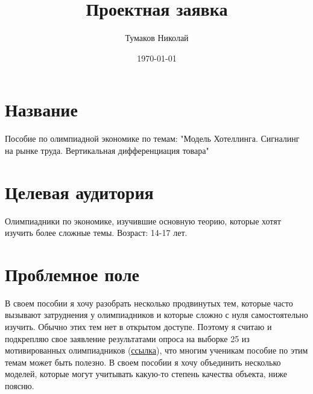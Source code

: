 


\title{Проектная заявка}
\author{Тумаков Николай}
\date{\today}




\maketitle

\section*{}

\section{Название}
Пособие по олимпиадной экономике по темам: "Модель Хотеллинга. Сигналинг на рынке труда. Вертикальная дифференциация товара"

\section{Целевая аудитория}
Олимпиадники по экономике, изучившие основную теорию, которые хотят изучить более сложные темы. Возраст: 14-17 лет.

\section{Проблемное поле}
В своем пособии я хочу разобрать несколько продвинутых тем, которые часто вызывают затруднения у олимпиадников и которые сложно с нуля самостоятельно изучить. Обычно этих тем нет в открытом доступе. Поэтому я считаю и подкрепляю свое заявление результатами опроса на выборке 25 из мотивированных олимпиадников (\href{https://docs.google.com/document/d/1WK_wnkck95BfUkFfhx7ZT7HdcT96Bs2Y3aL5qas-0lE/edit?usp=sharing}{ссылка}), что многим ученикам пособие по этим темам может быть полезно. В своем пособии я хочу объединить несколько моделей, которые могут учитывать какую-то степень качества объекта, ниже поясню.

